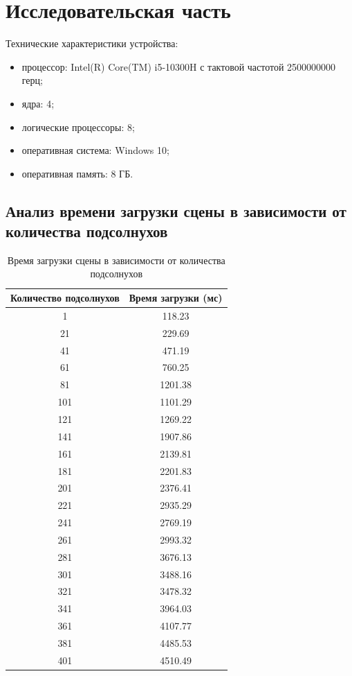 \chapter{Исследовательская часть}

Технические характеристики устройства:
\begin{itemize}
    \item процессор: Intel(R) Core(TM) i5-10300H с тактовой частотой 2500000000 герц;
	\item ядра:	4;
	\item логические процессоры:	8;
    \item оперативная система: Windows 10;
    \item оперативная память: 8 ГБ.
\end{itemize}



\section{Анализ времени загрузки сцены в зависимости от количества подсолнухов}

\begin{table}[h!]
\centering
\caption{Время загрузки сцены в зависимости от количества подсолнухов}
\label{tab:sunflower_loading_time}
\begin{tabular}{|c|c|}
\hline
\textbf{Количество подсолнухов} & \textbf{Время загрузки (мс)} \\ \hline
1 & 118.23 \\ \hline
21 & 229.69 \\ \hline
41 & 471.19 \\ \hline
61 & 760.25 \\ \hline
81 & 1201.38 \\ \hline
101 & 1101.29 \\ \hline
121 & 1269.22 \\ \hline
141 & 1907.86 \\ \hline
161 & 2139.81 \\ \hline
181 & 2201.83 \\ \hline
201 & 2376.41 \\ \hline
221 & 2935.29 \\ \hline
241 & 2769.19 \\ \hline
261 & 2993.32 \\ \hline
281 & 3676.13 \\ \hline
301 & 3488.16 \\ \hline
321 & 3478.32 \\ \hline
341 & 3964.03 \\ \hline
361 & 4107.77 \\ \hline
381 & 4485.53 \\ \hline
401 & 4510.49 \\ \hline
\end{tabular}
\end{table}

